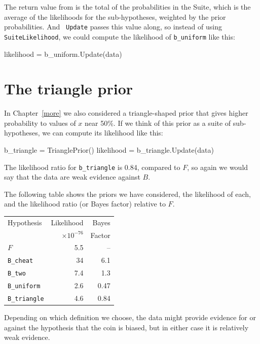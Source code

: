 \documentclass[12pt]{book}
\theoremstyle{exercise}
\begin{document}
The return value from  is the total of the
probabilities in the Suite, which is the average of the likelihoods
for the sub-hypotheses, weighted by the prior probabilities.  And {\tt
  Update} passes this value along, so instead of using {\tt
  SuiteLikelihood}, we could compute the likelihood of
\verb"b_uniform" like this:

\begin{code}
    likelihood = b_uniform.Update(data)
\end{code}



\section{The triangle prior}

In Chapter~\ref{more} we also considered a triangle-shaped prior that
gives higher probability to values of $x$ near 50\%.  If we think of
this prior as a suite of sub-hypotheses, we can compute its likelihood
like this:

\begin{code}
    b_triangle = TrianglePrior()
    likelihood = b_triangle.Update(data)
\end{code}

The likelihood ratio for \verb"b_triangle" is 0.84, compared to $F$, so
again we would say that the data are weak evidence against $B$.

The following table shows the priors we have considered, the
likelihood of each, and the likelihood ratio (or Bayes factor)
relative to $F$.

\begin{tabular}{|l|r|r|}
\hline
Hypothesis   & Likelihood & Bayes  \\
             & $\times 10^{-76}$ & Factor  \\
\hline
$F$              & 5.5   & --   \\
\verb"B_cheat"  & 34   &  6.1   \\
\verb"B_two"     & 7.4   &  1.3   \\
\verb"B_uniform"  & 2.6   &  0.47   \\
\verb"B_triangle"  & 4.6   &  0.84   \\
\hline
\end{tabular}

Depending on which definition we choose, the data might provide
evidence for or against the hypothesis that the coin is biased, but
in either case it is relatively weak evidence.
\end{document}
